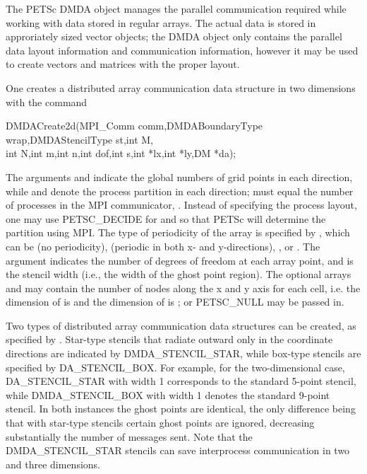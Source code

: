 The PETSc DMDA object manages the parallel communication required
while working with data stored in regular arrays. The actual data
is stored in approriately sized vector objects; the DMDA object 
only contains the parallel data layout information and communication
information, however it may be used to create vectors and matrices with the
proper layout.

One creates a distributed array communication data structure 
in two dimensions with the command 
\begin{tabbing}
  DMDACreate2d(MPI\_Comm comm,DMDABoundaryType wrap,DMDAStencilType st,int M,\\
             int N,int m,int n,int dof,int s,int *lx,int *ly,DM *da);
\end{tabbing}
The   arguments
  and  indicate the global
numbers of grid points in each direction, while  and 
denote the process partition in each direction;  must equal
the number of processes in the MPI communicator, .  
Instead of specifying the process layout, one may use
PETSC_DECIDE for  and  
so that PETSc will determine the partition using MPI. The type of
periodicity of the array is specified by , which can be 
  (no periodicity), 
  (periodic in
both x- and y-directions),  , 
or .  The argument  
indicates the number of degrees of freedom at each array point,
and  is the stencil width (i.e., the width of the ghost point region).
The optional arrays  and  may contain the number of nodes
along the x and y axis for each cell, i.e. the dimension of  is
 and the dimension of  is ; or PETSC_NULL 
may be passed in.

Two types of distributed array communication data structures 
can be created, as specified by .
Star-type stencils that radiate outward only in the coordinate
directions are indicated by DMDA\_STENCIL\_STAR,
while box-type stencils are specified by
DA\_STENCIL\_BOX. For example, for the
two-dimensional case,
DA\_STENCIL\_STAR with width 1 corresponds to the standard 5-point
stencil, while DMDA\_STENCIL\_BOX with width 1 denotes the
standard 9-point stencil.  In both instances the ghost points are
identical, the only difference being that with star-type stencils
certain ghost points are ignored, decreasing substantially
the number of messages sent.  Note that the DMDA\_STENCIL\_STAR
stencils can save interprocess communication in two and three
dimensions.

